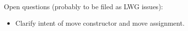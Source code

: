 Open questions (probably to be filed as LWG issues):
\begin{itemize}
\item
Clarify intent of  move constructor and move assignment.
\end{itemize}


\newpage


{}
\hypertarget{toctarget}{\tableofcontents*}

\setcounter{tocdepth}{5}

%
